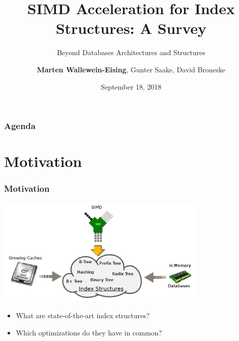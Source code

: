 \documentclass{beamer}
\title[SIMD Acceleration for main-memory Index Structures: A Survey]{SIMD Acceleration for  Index Structures: A Survey}
\subtitle{Beyond Databases Architectures and Structures}
\author[Wallewein-Eising et al.]{\textbf{Marten Wallewein-Eising}, Gunter Saake, David Broneske}
\date{September 18, 2018}
\institute{University of Magdeburg}
\begin{document}
\begin{frame}[plain]
\titlepage


\end{frame}

\section[Agenda]{}
\begin{frame}
\frametitle{Agenda}
\tableofcontents
\end{frame}

\section{Motivation}
\begin{frame}
\frametitle{Motivation}
\begin{center}
\includegraphics[width=0.75\textwidth]{img/big_picture_new.pdf}
\end{center}
\begin{itemize}[label=\textbullet,leftmargin=1em]
\item What are state-of-the-art index structures?
\item Which optimizations do they have in common?
\end{itemize}
\end{frame}
\end{document}
